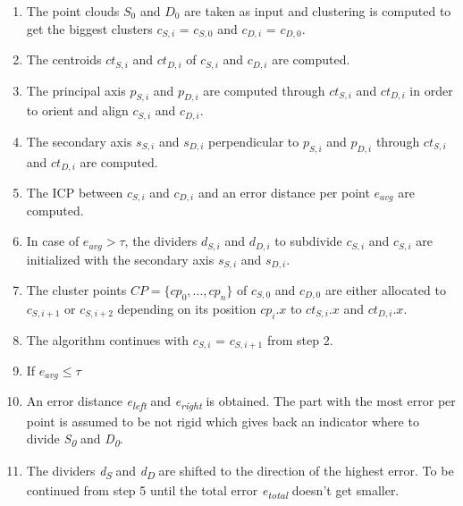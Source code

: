 \documentclass[a4paper,english,11pt]{report}
\begin{document}
\begin{enumerate}
	\item The point clouds $S_0$ and $D_0$ are taken as input and clustering is computed to get the biggest clusters $c_{S, i}$ = $c_{S, 0}$ and $c_{D, i}$ = $c_{D, 0}$.
	
	\item The centroids $ct_{S, i}$ and $ct_{D, i}$ of $c_{S, i}$ and $c_{D, i}$ are computed.
	
	\item The principal axis $p_{S, i}$ and $p_{D, i}$ are computed through $ct_{S, i}$ and $ct_{D, i}$ in order to orient and align $c_{S, i}$ and $c_{D, i}$.
	
	\item The secondary axis $s_{S, i}$ and $s_{D, i}$ perpendicular to $p_{S, i}$ and $p_{D, i}$ through $ct_{S, i}$ and $ct_{D, i}$ are computed.
	
	\item The ICP between $c_{S, i}$ and $c_{D, i}$ and an error distance per point $e_{avg}$ are computed. 
	
	\item In case of $e_{avg} > \tau$, the dividers $d_{S, i}$ and $d_{D, i}$ to subdivide $c_{S, i}$ and $c_{S, i}$ are initialized with the secondary axis $s_{S, i}$ and $s_{D, i}$.
	
	\item The cluster points $ CP =  \{ {cp_0, ..., cp_n}\}$ of $c_{S, 0}$ and $c_{D, 0}$  are either allocated to $c_{S, i + 1}$ or $c_{S, i + 2}$ depending on its position $cp_i.x$ to $ct_{S, i}.x$ and $ct_{D, i}.x$. 
	
	\item The algorithm continues with $c_{S, i}$ = $c_{S, i + 1}$ from step 2.
	
	\item If $e_{avg} \le \tau$
	
	\item An error distance \textit{e\textsubscript{left}} and \textit{e\textsubscript{right}} is obtained. The part with the most error per point is assumed to be not rigid which gives back an indicator where to divide \textit{S\textsubscript{0}} and \textit{D\textsubscript{0}}.
	
	\item The dividers \textit{d\textsubscript{S}} and \textit{d\textsubscript{D}} are shifted to the direction of the highest error. To be continued from step 5 until the total error \textit{e\textsubscript{total}} doesn't get smaller.
\end{enumerate}
\end{document}
